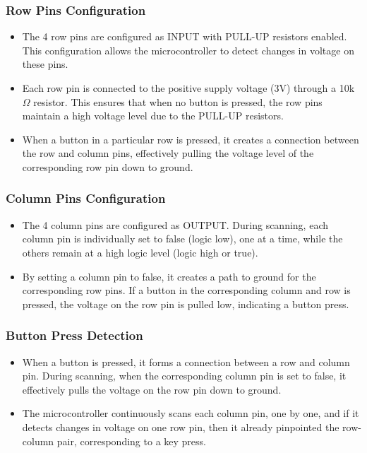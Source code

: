 \subsubsection*{Row Pins Configuration}
\begin{itemize}
	\item The 4 row pins are configured as INPUT with PULL-UP resistors enabled. This configuration allows the 
	microcontroller to detect changes in voltage on these pins.
	\item Each row pin is connected to the positive supply voltage (3V) through a 10k$\Omega$ resistor. This ensures 
	that when no button is pressed, the row pins maintain a high voltage level due to the PULL-UP resistors.
	\item When a button in a particular row is pressed, it creates a connection between the row and column pins, 
	effectively pulling the voltage level of the corresponding row pin down to ground.
\end{itemize}

\subsubsection*{Column Pins Configuration}
\begin{itemize}
	\item The 4 column pins are configured as OUTPUT. During scanning, each column pin is individually set to false (logic 
	low), one at a time, while the others remain at a high logic level (logic high or true).
	\item By setting a column pin to false, it creates a path to ground for the corresponding row pins. If a button in the 
	corresponding column and row is pressed, the voltage on the row pin is pulled low, indicating a button press.
\end{itemize}

\subsubsection*{Button Press Detection}
\begin{itemize}
	\item When a button is pressed, it forms a connection between a row and column pin. During scanning, when the 
	corresponding column pin is set to false, it effectively pulls the voltage on the row pin down to ground.
	\item The microcontroller continuously scans each column pin, one by one, and if it detects changes in voltage on one 
	row pin, then it already pinpointed the row-column pair, corresponding to a key press.
\end{itemize}

